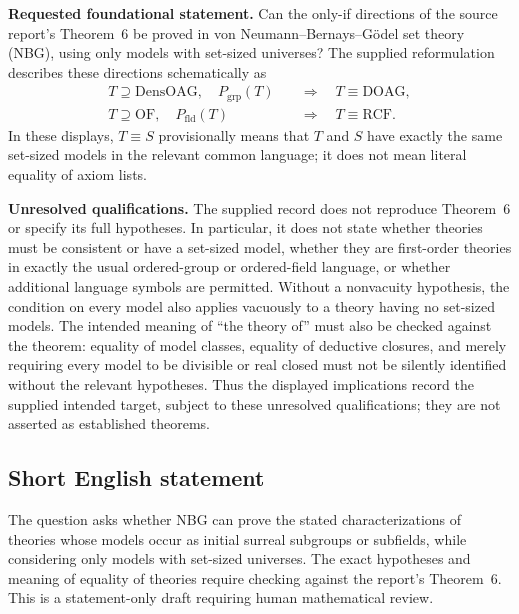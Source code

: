 \documentclass[11pt]{article}
\begin{document}
\textbf{Requested foundational statement.} Can the only-if directions of the source report's Theorem~6 be proved in von Neumann--Bernays--G\"odel set theory (NBG), using only models with set-sized universes? The supplied reformulation describes these directions schematically as
\[
\begin{aligned}
 T\supseteq\mathrm{DensOAG},\quad P_{\mathrm{grp}}(T)
 &\quad\Longrightarrow\quad T\equiv\mathrm{DOAG},\\
 T\supseteq\mathrm{OF},\quad P_{\mathrm{fld}}(T)
 &\quad\Longrightarrow\quad T\equiv\mathrm{RCF}.
\end{aligned}
\]
In these displays, \(T\equiv S\) provisionally means that \(T\) and \(S\) have exactly the same set-sized models in the relevant common language; it does not mean literal equality of axiom lists.

\textbf{Unresolved qualifications.} The supplied record does not reproduce Theorem~6 or specify its full hypotheses. In particular, it does not state whether theories must be consistent or have a set-sized model, whether they are first-order theories in exactly the usual ordered-group or ordered-field language, or whether additional language symbols are permitted. Without a nonvacuity hypothesis, the condition on every model also applies vacuously to a theory having no set-sized models. The intended meaning of ``the theory of'' must also be checked against the theorem: equality of model classes, equality of deductive closures, and merely requiring every model to be divisible or real closed must not be silently identified without the relevant hypotheses. Thus the displayed implications record the supplied intended target, subject to these unresolved qualifications; they are not asserted as established theorems.
\subsection{Short English statement}
The question asks whether NBG can prove the stated characterizations of theories whose models occur as initial surreal subgroups or subfields, while considering only models with set-sized universes. The exact hypotheses and meaning of equality of theories require checking against the report's Theorem~6. This is a statement-only draft requiring human mathematical review.
\end{document}
